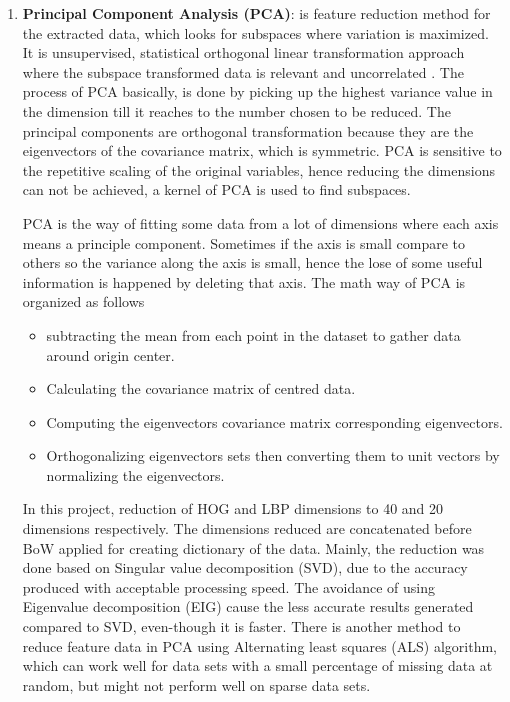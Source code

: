 \begin{enumerate}
\item \textbf{Principal Component Analysis (PCA)}: is feature reduction method for the extracted data, which looks for subspaces where variation is maximized.
It is unsupervised, statistical orthogonal linear transformation approach where the subspace transformed data is relevant and uncorrelated .
The process of PCA basically, is done by picking up the highest variance value in the dimension till it reaches to the number chosen to be reduced.
The principal components are orthogonal transformation because they are the eigenvectors of the covariance matrix, which is symmetric.
PCA is sensitive to the repetitive scaling of the original variables, hence reducing the dimensions can not be achieved, a kernel of PCA is used to find subspaces.

PCA is the way of fitting some data from a lot of dimensions where each axis means a principle component.
Sometimes if the axis is small compare to others so the variance along the axis is small, hence the lose of some useful information is happened by deleting that axis. 
The math way of PCA is organized as follows
\begin{itemize}
\item subtracting the mean from each point in the dataset to gather data around origin center.
\item Calculating the covariance matrix of centred data.
\item Computing the eigenvectors covariance matrix corresponding eigenvectors.
\item Orthogonalizing eigenvectors sets then converting them to unit vectors by normalizing the eigenvectors.
\end{itemize}

In this project, reduction of HOG and LBP dimensions to 40 and 20 dimensions respectively.
The dimensions reduced are concatenated before BoW applied for creating dictionary of the data.
Mainly, the reduction was done based on Singular value decomposition (SVD), due to the accuracy produced with acceptable processing speed.
The avoidance of using Eigenvalue decomposition (EIG) cause the less accurate results generated compared to SVD, even-though it is faster.
There is another method to reduce feature data in PCA using Alternating least squares (ALS) algorithm, which can work well for data sets with a small percentage of missing data at random, but might not perform well on sparse data sets\cite{jackson2005user}.


\end{enumerate}
